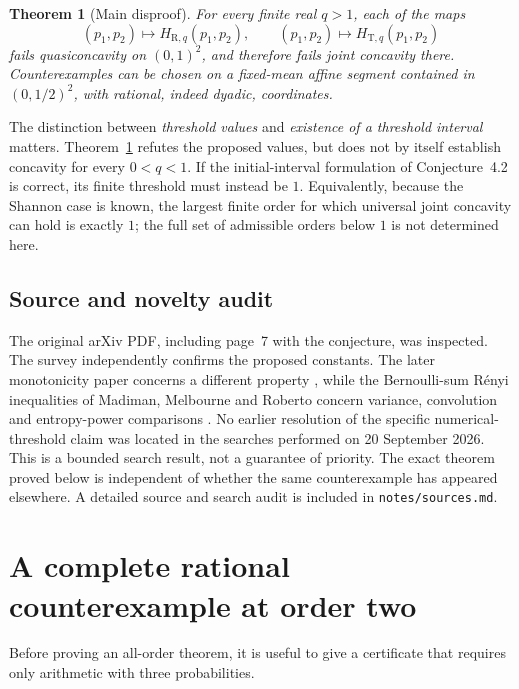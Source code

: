 \documentclass[11pt]{article}
\numberwithin{equation}{section}
\newtheorem{theorem}{Theorem}[section]
\theoremstyle{definition}
\theoremstyle{remark}
\begin{document}
\begin{theorem}[Main disproof]\label{thm:main}
For every finite real $q>1$, each of the maps
\[
 (p_1,p_2)\longmapsto H_{\mathrm R,q}(p_1,p_2),\qquad
 (p_1,p_2)\longmapsto H_{\mathrm T,q}(p_1,p_2)
\]
fails quasiconcavity on $(0,1)^2$, and therefore fails joint concavity there.
Counterexamples can be chosen on a fixed-mean affine segment contained in
$(0,1/2)^2$, with rational, indeed dyadic, coordinates.
\end{theorem}

The distinction between \emph{threshold values} and \emph{existence of a
threshold interval} matters. Theorem~\ref{thm:main} refutes the proposed
values, but does not by itself establish concavity for every $0<q<1$.
If the initial-interval formulation of Conjecture~4.2 is correct, its finite
threshold must instead be $1$. Equivalently, because the Shannon case is
known, the largest finite order for which universal joint concavity can hold
is exactly $1$; the full set of admissible orders below $1$ is not determined
here.

\subsection{Source and novelty audit}
The original arXiv PDF, including page~7 with the conjecture, was inspected.
The survey independently confirms the proposed constants. The later
monotonicity paper concerns a different property \cite{HJ2019}, while the
Bernoulli-sum R\'enyi inequalities of Madiman, Melbourne and Roberto concern
variance, convolution and entropy-power comparisons \cite{MMR2023}.
No earlier resolution of the specific numerical-threshold claim was located
in the searches performed on 20 September 2026. This is a bounded search
result, not a guarantee of priority. The exact theorem proved below is
independent of whether the same counterexample has appeared elsewhere.
A detailed source and search audit is included in \texttt{notes/sources.md}.

\section{A complete rational counterexample at order two}
Before proving an all-order theorem, it is useful to give a certificate that
requires only arithmetic with three probabilities.
\end{document}

